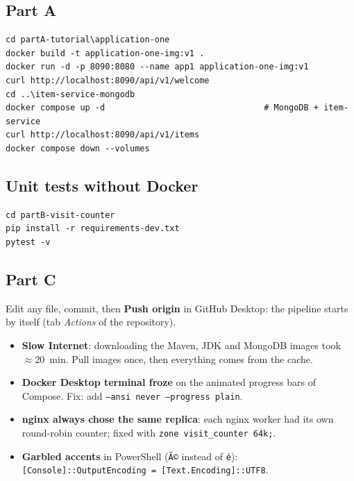 \documentclass[11pt,a4paper]{article}
\begin{document}
\subsection*{Part A}
\begin{lstlisting}[language=shell]
cd partA-tutorial\application-one
docker build -t application-one-img:v1 .
docker run -d -p 8090:8080 --name app1 application-one-img:v1
curl http://localhost:8090/api/v1/welcome
cd ..\item-service-mongodb
docker compose up -d                                # MongoDB + item-service
curl http://localhost:8090/api/v1/items
docker compose down --volumes
\end{lstlisting}

\subsection*{Unit tests without Docker}
\begin{lstlisting}[language=shell]
cd partB-visit-counter
pip install -r requirements-dev.txt
pytest -v
\end{lstlisting}

\subsection*{Part C}
Edit any file, commit, then \textbf{Push origin} in GitHub Desktop: the pipeline starts by
itself (tab \emph{Actions} of the repository).

\begin{warn}
\begin{itemize}[leftmargin=1.2em]
\item \textbf{Slow Internet}: downloading the Maven, JDK and MongoDB images took $\approx$20~min. Pull images once, then everything comes from the cache.
\item \textbf{Docker Desktop terminal froze} on the animated progress bars of Compose. Fix: add \texttt{--ansi never --progress plain}.
\item \textbf{nginx always chose the same replica}: each nginx worker had its own round-robin counter; fixed with \texttt{zone visit\_counter 64k;}.
\item \textbf{Garbled accents} in PowerShell (\texttt{Ã©} instead of \texttt{é}): \texttt{[Console]::OutputEncoding = [Text.Encoding]::UTF8}.
\end{itemize}
\end{warn}
\end{document}
